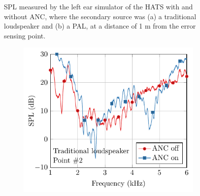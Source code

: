 \begin{figure}[!htb]
\begin{subfigure}{0.4\textwidth}
    \end{subfigure}
    \caption{SPL  measured by the left ear simulator of the HATS with and without ANC, where the secondary source was (a) a traditional loudspeaker and (b) a PAL, at a distance of 1 m from the error sensing point.}
    \label{fig:ancpal_ear_HATS}
\end{figure}

\begin{figure}[!htb]
    \centering
    \begin{subfigure}{0.4\textwidth}
        \centering
        \includegraphics[width = \textwidth]{fig/Genelc_eval2_ANC_spectrum.pdf}
        \caption{}
    \end{subfigure}
    \begin{subfigure}{0.4\textwidth}
        \centering

\end{subfigure}
\end{figure}
